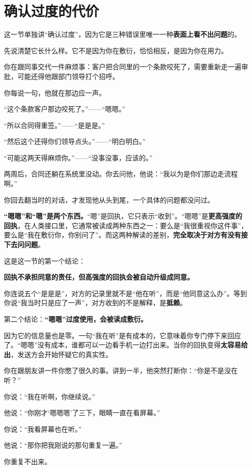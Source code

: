 \section{确认过度的代价}

这一节单独讲“确认过度”，因为它是三种错误里唯一一种\textbf{表面上看不出问题}的。

先说清楚它长什么样。它不是因为你在敷衍，恰恰相反，是因为你在用力。

\par
\begin{mdquote}
你在跟同事交代一件麻烦事：客户把合同里的一个条款咬死了，需要重新走一遍审批，可能还得他跟部门领导打个招呼。

你每说一句，他就在那边应一声。

“这个条款客户那边咬死了。”——“嗯嗯。”

“所以合同得重签。”——“是是是。”

“然后这个还得你们领导点头。”——“明白明白。”

“可能这两天得麻烦你。”——“没事没事，应该的。”

两周后，合同还躺在系统里没动。你去问他，他说：“我以为是你们那边走流程啊。”

你回去翻当时的对话，才发现他从头到尾，一个具体的问题都没问过。
\end{mdquote}

\textbf{“嗯嗯”和“嗯”是两个东西。}“嗯”是回执，它只表示“收到”。“嗯嗯”是\textbf{更高强度的回执}，在人类接口里，它通常被读成两种东西之一：要么是“我很重视你这件事”，要么是“我在敷衍你，你别问了”。而这两种解读的差别，\textbf{完全取决于对方有没有接下去问问题}。

这是这一节的第一个结论：

\textbf{回执不承担同意的责任，但高强度的回执会被自动升级成同意。}

你连说五个“是是是”，对方的记录里就不是“他在听”，而是“他同意这么办”。等到你说“我当时只是应了一声”，对方收到的不是解释，是\textbf{抵赖}。

第二个结论：\textbf{“嗯嗯”过度使用，会被读成敷衍。}

因为它的信息量也是零。一句“我在听”是有成本的，它意味着你专门停下来回应了。“嗯嗯”没有成本，谁都可以一边看手机一边打出来。当你的回执变得\textbf{太容易给出}，发送方会开始怀疑它的真实性。

\par
\begin{mdquote}
你在跟朋友讲一件你憋了很久的事。讲到一半，他突然打断你：“你是不是没在听？”

你说：“我在听啊，你继续说。”

他说：“你刚才‘嗯嗯嗯’了三下，眼睛一直在看屏幕。”

你说：“我看屏幕也在听。”

他说：“那你把我刚说的那句重复一遍。”

你重复不出来。
\end{mdquote}

